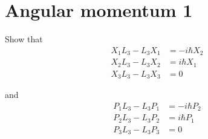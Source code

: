 

\section*{Angular momentum 1}

Show that
\begin{align*}
X_1L_3-L_3X_1&=-i\hbar X_2
\\
X_2L_3-L_3X_2&=i\hbar X_1
\\
X_3L_3-L_3X_3&=0
\end{align*}

and
\begin{align*}
P_1L_3-L_3P_1&=-i\hbar P_2
\\
P_2L_3-L_3P_2&=i\hbar P_1
\\
P_3L_3-L_3P_3&=0
\end{align*}



